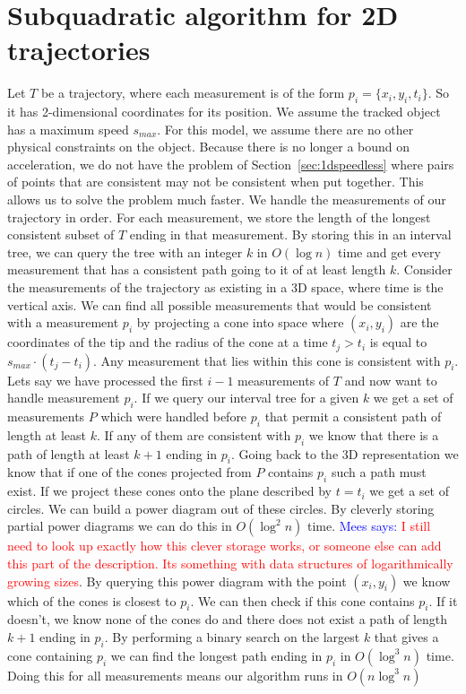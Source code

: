 \documentclass{article}
\def\marrow{{\marginpar[\hfill$\longrightarrow$]{$\longleftarrow$}}}
\def\mees#1{{\sc \textcolor{blue}{Mees says: }}{\marrow\sf \textcolor{red}{#1}}}
\begin{document}
\section{Subquadratic algorithm for 2D trajectories}
\label{sec:2Dcones}
Let \(T\) be a trajectory, where each measurement is of the form \(p_i=\{x_i,y_i,t_i\}\). So it has 2-dimensional coordinates for its position. We assume the tracked object has a maximum speed \(s_{max}\). For this model, we assume there are no other physical constraints on the object.
Because there is no longer a bound on acceleration, we do not have the problem of Section~\ref{sec:1dspeedless} where pairs of points that are consistent may not be consistent when put together. This allows us to solve the problem much faster.
We handle the measurements of our trajectory in order. For each measurement, we store the length of the longest consistent subset of \(T\) ending in that measurement. By storing this in an interval tree, we can query the tree with an integer \(k\) in \(O(\log n)\) time and get every measurement that has a consistent path going to it of at least length \(k\).  
Consider the measurements of the trajectory as existing in a 3D space, where time is the vertical axis. We can find all possible measurements that would be consistent with a measurement \(p_i\) by projecting a cone into space where \((x_i,y_i)\) are the coordinates of the tip and the radius of the cone at a time \(t_j > t_i\) is equal to \(s_{max}\cdot (t_j-t_i)\). Any measurement that lies within this cone is consistent with \(p_i\). 
Lets say we have processed the first \(i-1\) measurements of \(T\) and now want to handle measurement \(p_i\). If we query our interval tree for a given \(k\) we get a set of measurements \(P\) which were handled before \(p_i\) that permit a consistent path of length at least \(k\). If any of them are consistent with \(p_i\) we know that there is a path of length at least \(k+1\) ending in \(p_i\). Going back to the 3D representation we know that if one of the cones projected from  \(P\) contains \(p_i\) such a path must exist. If we project these cones onto the plane described by \(t=t_i\) we get a set of circles. We can build a power diagram out of these circles. By cleverly storing partial power diagrams we can do this in \(O(\log^2 n)\) time. \mees{I still need to look up exactly how this clever storage works, or someone else can add this part of the description. Its something with data structures of logarithmically growing sizes}. By querying this power diagram with the point \((x_i,y_i)\) we know which of the cones is closest to \(p_i\). We can then check if this cone contains \(p_i\). If it doesn't, we know none of the cones do and there does not exist a path of length \(k+1\) ending in \(p_i\). 
By performing a binary search on the largest \(k\) that gives a cone containing \(p_i\) we can find the longest path ending in \(p_i\) in \(O(\log^3 n)\) time. Doing this for all measurements means our algorithm runs in \(O(n\log^3 n)\)
\end{document}
